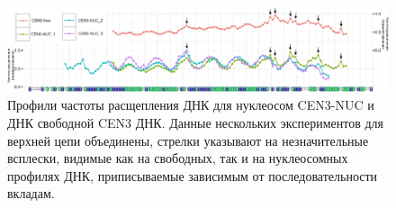 \begin{figure}[H]
    \centering
    \includegraphics[width=\textwidth]{images/p5/part5_2_nar/p5_2_f6.pdf}
    \caption[Профили частоты расщепления ДНК для нуклеосом CEN3-NUC и ДНК свободной CEN3 ДНК]{Профили частоты расщепления ДНК для нуклеосом CEN3-NUC и ДНК свободной CEN3 ДНК. Данные нескольких экспериментов для верхней цепи объединены, стрелки указывают на незначительные всплески, видимые как на свободных, так и на нуклеосомных профилях ДНК, приписываемые зависимым от последовательности вкладам.}
    \label{fig:p5:p5_2_f6}
\end{figure}




